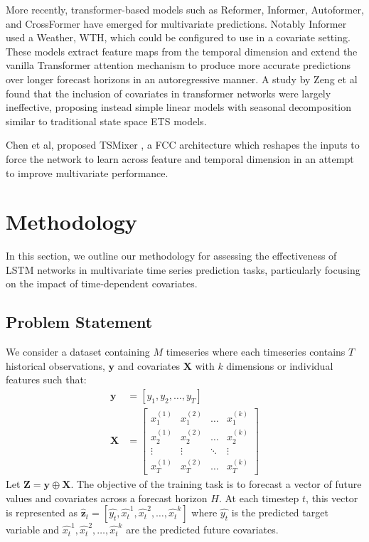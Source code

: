 \documentclass{article}
\newcommand{\horizon}{H}
\newcommand{\timeserieslength}{T}
\newcommand{\datasettscount}{M}
\begin{document}
More recently, transformer-based models such as Reformer, Informer, Autoformer, and CrossFormer
\cite{kitaev2020reformer,zhou2021informer,wu2022autoformer, zhang2023crossformer} have emerged for multivariate predictions. Notably Informer used a 
Weather, WTH,  which could be configured to use in a covariate setting. These models extract feature maps from the temporal dimension and extend the 
vanilla Transformer attention mechanism to produce more accurate predictions over longer forecast horizons in an autoregressive manner. 
A study by Zeng et al \cite{zeng2022transformers} found that the inclusion of covariates in transformer networks were largely ineffective, proposing instead 
simple linear models with seasonal decomposition similar to traditional state space ETS models.

Chen et al, proposed TSMixer \cite{chen2023tsmixer}, a FCC architecture which reshapes the inputs to force the network to learn across feature and temporal dimension in an 
attempt to improve multivariate performance.

\section{Methodology}
In this section, we outline our methodology for assessing the effectiveness of LSTM networks in 
multivariate time series prediction tasks, particularly focusing on the impact of time-dependent covariates.

\subsection{Problem Statement}
We consider a dataset containing $\datasettscount$ timeseries where each timeseries contains $\timeserieslength$ historical observations, $\mathbf{y}$ 
and covariates $\mathbf{X}$ with $k$ dimensions or individual features such that:
\begin{align*}
\mathbf{y} &= [y_1, y_2, \dots, y_T] \\
\mathbf{X} &= \begin{bmatrix}
x_1^{(1)} & x_1^{(2)} & \ldots & x_1^{(k)} \\
x_2^{(1)} & x_2^{(2)} & \ldots & x_2^{(k)} \\
\vdots & \vdots & \ddots & \vdots \\
x_T^{(1)} & x_T^{(2)} & \ldots & x_T^{(k)}
\end{bmatrix}
\end{align*}
Let $\mathbf{Z} = \mathbf{y} \oplus \mathbf{X}$. The objective of the training task is to forecast a vector of future values and covariates across a forecast horizon $\horizon$. 
At each timestep $t$, this vector is represented as ${\mathbf{\hat{z}}_t} = [\hat{y_t}, \hat{x_t}^1, \hat{x_t}^2, \dots, \hat{x_t}^k]$ where $\hat{y_t}$ is the predicted target variable
and $\hat{x_t}^1, \hat{x_t}^2, \dots, \hat{x_t}^k$ are the predicted future covariates. 
\end{document}
